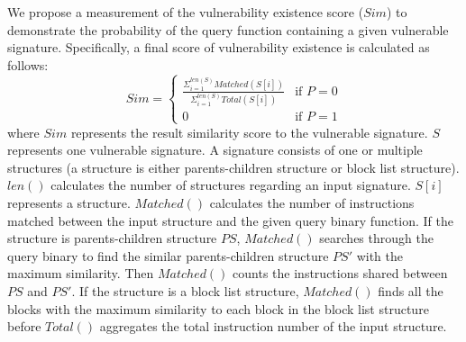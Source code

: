 We propose a measurement of the vulnerability existence score ($Sim$) to demonstrate the probability of the query function containing a given vulnerable signature. 
Specifically, a final score of vulnerability existence is calculated as follows:
\[Sim=\begin{cases}\frac{\Sigma_{i=1}^{len(S)}Matched(S[i])}{\Sigma_{i=1}^{len(S)}Total(S[i])} &\text{if }P=0\\0 &\text{if }P=1
\end{cases}\]
where $Sim$ represents the result similarity score to the vulnerable signature. 
$S$ represents one vulnerable signature. 
A signature consists of one or multiple structures (a structure is either parents-children structure or block list structure). 
$len()$ calculates the number of structures regarding an input signature.
$S[i]$ represents a structure. 
$Matched()$ calculates the number of instructions matched between the input structure and the given query binary function. 
If the structure is parents-children structure $PS$, $Matched()$ searches through the query binary to find the similar parents-children structure $PS'$ with the maximum similarity. 
Then $Matched()$ counts the instructions shared between $PS$ and $PS'$. 
If the structure is a block list structure, $Matched()$ finds all the blocks with the maximum similarity to each block in the block list structure before $Total()$ aggregates the total instruction number of the input structure.  


